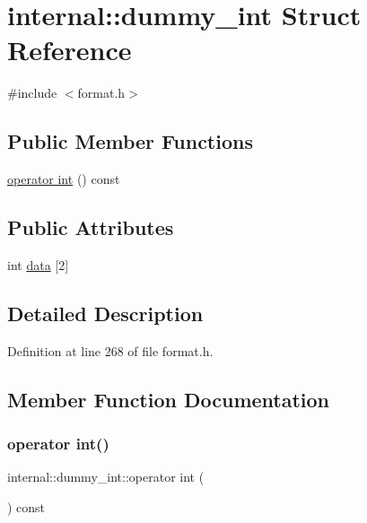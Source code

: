 \hypertarget{structinternal_1_1dummy__int}{}\section{internal\+:\+:dummy\+\_\+int Struct Reference}
\label{structinternal_1_1dummy__int}


{\ttfamily \#include $<$format.\+h$>$}

\subsection*{Public Member Functions}
\begin{DoxyCompactItemize}
\item 
\hyperlink{structinternal_1_1dummy__int_aec6b29a8b21fbd34a1907f9e9e870a49}{operator int} () const
\end{DoxyCompactItemize}
\subsection*{Public Attributes}
\begin{DoxyCompactItemize}
\item 
int \hyperlink{structinternal_1_1dummy__int_a3f4ae21cfd3419d4b683e71ee347670b}{data} \mbox{[}2\mbox{]}
\end{DoxyCompactItemize}


\subsection{Detailed Description}


Definition at line 268 of file format.\+h.



\subsection{Member Function Documentation}
\mbox{\label{structinternal_1_1dummy__int_aec6b29a8b21fbd34a1907f9e9e870a49}} 
\subsubsection{\texorpdfstring{operator int()}{operator int()}}
{\footnotesize\ttfamily internal\+::dummy\+\_\+int\+::operator int (\begin{DoxyParamCaption}{ }\end{DoxyParamCaption}) const\hspace{0.3cm}{\ttfamily [inline]}}



